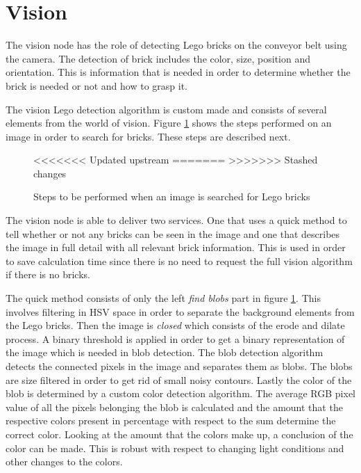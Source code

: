 \section{Vision}
\label{sec:rc_hmi_sec}
The vision node has the role of detecting Lego bricks on the conveyor belt using the camera. The detection of brick includes the color, size, position and orientation. This is information that is needed in order to determine whether the brick is needed or not and how to grasp it. 

The vision Lego detection algorithm is custom made and consists of several elements from the world of vision. Figure \ref{fig:rc_vision_steps_thor} shows the steps performed on an image in order to search for bricks. These steps are described next.\\
	
	\begin{figure}[H]
		\centering
<<<<<<< Updated upstream
=======
>>>>>>> Stashed changes
	    \caption{Steps to be performed when an image is searched for Lego bricks}
		\label{fig:rc_vision_steps_thor}
	\end{figure}
	
The vision node is able to deliver two services. One that uses a quick method to tell whether or not any bricks can be seen in the image and one that describes the image in full detail with all relevant brick information. This is used in order to save calculation time since there is no need to request the full vision algorithm if there is no bricks.

The quick method consists of only the left \textit{find blobs} part in figure \ref{fig:rc_vision_steps_thor}. This involves filtering in HSV space in order to separate the background elements from the Lego bricks. Then the image is \textit{closed} which consists of the erode and dilate process. A binary threshold is applied in order to get a binary representation of the image which is needed in blob detection. The blob detection algorithm detects the connected pixels in the image and separates them as blobs. The blobs are size filtered in order to get rid of small noisy contours. Lastly the color of the blob is determined by a custom color detection algorithm. The average RGB pixel value of all the pixels belonging the blob is calculated and the amount that the respective colors present in percentage with respect to the sum determine the correct color. Looking at the amount that the colors make up, a conclusion of the color can be made. This is robust with respect to changing light conditions and other changes to the colors. 

